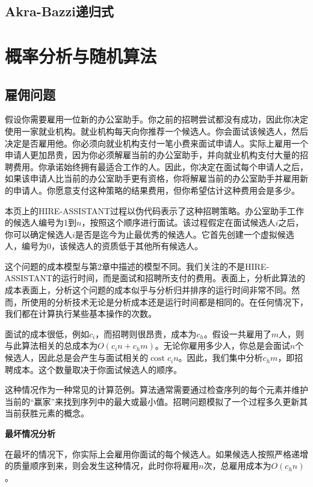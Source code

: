 \documentclass[lang=cn,newtx,10pt,scheme=chinese]{elegantbook}
\begin{document}
\section{Akra-Bazzi递归式}

\chapter{概率分析与随机算法}

\section{雇佣问题}

假设你需要雇用一位新的办公室助手。你之前的招聘尝试都没有成功，因此你决定使用一家就业机构。就业机构每天向你推荐一个候选人。你会面试该候选人，然后决定是否雇用他。你必须向就业机构支付一笔小费来面试申请人。实际上雇用一个申请人更加昂贵，因为你必须解雇当前的办公室助手，并向就业机构支付大量的招聘费用。你承诺始终拥有最适合工作的人。因此，你决定在面试每个申请人之后，如果该申请人比当前的办公室助手更有资格，你将解雇当前的办公室助手并雇用新的申请人。你愿意支付这种策略的结果费用，但你希望估计这种费用会是多少。

本页上的HIRE-ASSISTANT过程以伪代码表示了这种招聘策略。办公室助手工作的候选人编号为1到$n$，按照这个顺序进行面试。该过程假定在面试候选人$i$之后，你可以确定候选人$i$是否是迄今为止最优秀的候选人。它首先创建一个虚拟候选人，编号为0，该候选人的资质低于其他所有候选人。

这个问题的成本模型与第2章中描述的模型不同。我们关注的不是HIRE-ASSISTANT的运行时间，而是面试和招聘所支付的费用。表面上，分析此算法的成本表面上，分析这个问题的成本似乎与分析归并排序的运行时间非常不同。然而，所使用的分析技术无论是分析成本还是运行时间都是相同的。在任何情况下，我们都在计算执行某些基本操作的次数。

面试的成本很低，例如$c_i$，而招聘则很昂贵，成本为$c_h$。假设一共雇用了$m$人，则与此算法相关的总成本为$O\left(c_i n+c_h m\right)$。无论你雇用多少人，你总是会面试$n$个候选人，因此总是会产生与面试相关的$\operatorname{cost} c_i n$。因此，我们集中分析$c_h m$，即招聘成本。这个数量取决于你面试候选人的顺序。

这种情况作为一种常见的计算范例。算法通常需要通过检查序列的每个元素并维护当前的“赢家”来找到序列中的最大或最小值。招聘问题模拟了一个过程多久更新其当前获胜元素的概念。

\textbf{最坏情况分析}

在最坏的情况下，你实际上会雇用你面试的每个候选人。如果候选人按照严格递增的质量顺序到来，则会发生这种情况，此时你将雇用$n$次，总雇用成本为$O\left(c_h n\right)$。
\end{document}
